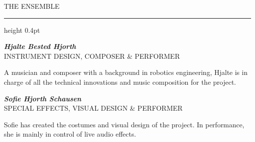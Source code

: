 \documentclass[10pt]{article}
\newcommand{\eyebrow}[1]{{\labelfont\fontsize{10}{12}\selectfont\color{ember}\MakeUppercase{#1}}}
\begin{document}
\begin{minipage}[t]{0.54\linewidth}
  \vspace{4mm}

  \eyebrow{The Ensemble}\\[1mm]
  {\color{hairline}\hrule height 0.4pt}
  \vspace{2mm}

  {\fontsize{10.6}{13}\selectfont\itshape\bfseries\color{brightcream} Hjalte Bested Hjorth}\\
  {\fontsize{7.4}{9}\selectfont\color{brass}\MakeUppercase{Instrument Design, Composer \& Performer}}\\[1mm]
  {\serifreader\fontsize{8.9}{13}\selectfont\color{bodytext}
   A musician and composer with a background in robotics engineering,
   Hjalte is in charge of all the technical innovations and music
   composition for the project.\par}

  \vspace{3mm}

  {\fontsize{10.6}{13}\selectfont\itshape\bfseries\color{brightcream} Sofie Hjorth Schausen}\\
  {\fontsize{7.4}{9}\selectfont\color{brass}\MakeUppercase{Special Effects, Visual Design \& Performer}}\\[1mm]
  {\serifreader\fontsize{8.9}{13}\selectfont\color{bodytext}
   Sofie has created the costumes and visual design of the project. In
   performance, she is mainly in control of live audio effects.\par}

\end{minipage}%
\hfill
\end{document}
